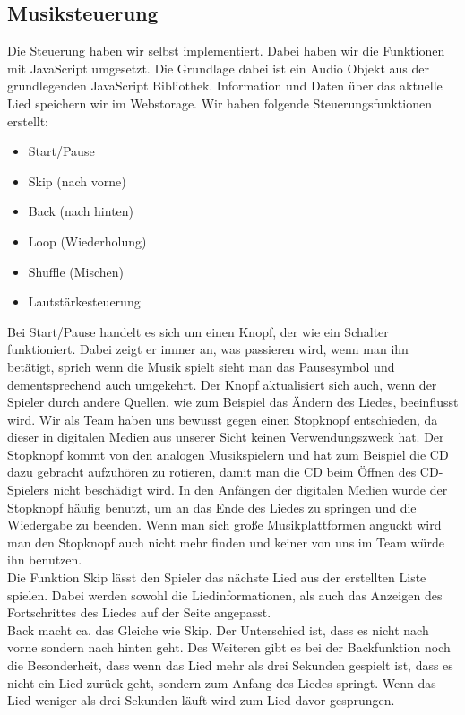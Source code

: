 \documentclass{article}
\begin{document}
\subsection{Musiksteuerung}
Die Steuerung haben wir selbst implementiert. Dabei haben wir die Funktionen mit JavaScript umgesetzt. Die Grundlage dabei ist ein Audio Objekt aus der grundlegenden JavaScript Bibliothek. Information und Daten über das aktuelle Lied speichern wir im Webstorage. Wir haben folgende Steuerungsfunktionen erstellt:
\begin{itemize}
    \item Start/Pause
    \item Skip (nach vorne)
    \item Back (nach hinten)
    \item Loop (Wiederholung)
    \item Shuffle (Mischen)
    \item Lautstärkesteuerung
\end{itemize}
Bei Start/Pause handelt es sich um einen Knopf, der wie ein Schalter funktioniert. Dabei zeigt er immer an, was passieren wird, wenn man ihn betätigt, sprich wenn die Musik spielt sieht man das Pausesymbol und dementsprechend auch umgekehrt. Der Knopf aktualisiert sich auch, wenn der Spieler durch andere Quellen, wie zum Beispiel das Ändern des Liedes, beeinflusst wird. Wir als Team haben uns bewusst gegen einen Stopknopf entschieden, da dieser in digitalen Medien aus unserer Sicht keinen Verwendungszweck hat. Der Stopknopf kommt von den analogen Musikspielern und hat zum Beispiel die CD dazu gebracht aufzuhören zu rotieren, damit man die CD beim Öffnen des CD-Spielers nicht beschädigt wird. In den Anfängen der digitalen Medien wurde der Stopknopf häufig benutzt, um an das Ende des Liedes zu springen und die Wiedergabe zu beenden. Wenn man sich große Musikplattformen anguckt wird man den Stopknopf auch nicht mehr finden und keiner von uns im Team würde ihn benutzen.\\

\noindent Die Funktion Skip lässt den Spieler das nächste Lied aus der erstellten Liste spielen. Dabei werden sowohl die Liedinformationen, als auch das Anzeigen des Fortschrittes des Liedes auf der Seite angepasst.\\

\noindent Back macht ca. das Gleiche wie Skip. Der Unterschied ist, dass es nicht nach vorne sondern nach hinten geht. Des Weiteren gibt es bei der Backfunktion noch die Besonderheit, dass wenn das Lied mehr als drei Sekunden gespielt ist, dass es nicht ein Lied zurück geht, sondern zum Anfang des Liedes springt. Wenn das Lied weniger als drei Sekunden läuft wird zum Lied davor gesprungen.\\
\end{document}
